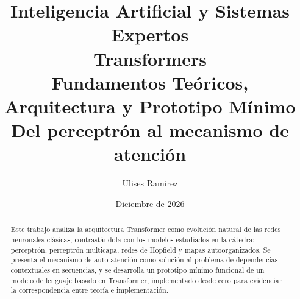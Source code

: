 \documentclass[12pt, a4paper]{article}
\title{
    \vspace{-1cm}
    {\large Inteligencia Artificial y Sistemas Expertos} \\[0.5em]
    \textbf{ Transformers } \\
    Fundamentos Teóricos, Arquitectura y Prototipo Mínimo \\[0.5em]
    {\normalsize Del perceptrón al mecanismo de atención}
}
\author{Ulises Ramirez}
\date{Diciembre de 2026}
\begin{document}
\maketitle
\thispagestyle{empty}

\begin{abstract}
Este trabajo analiza la arquitectura Transformer como evolución natural
de las redes neuronales clásicas, contrastándola con los modelos estudiados
en la cátedra: perceptrón, perceptrón multicapa, redes de Hopfield y mapas
autoorganizados. Se presenta el mecanismo de auto-atención como solución al
problema de dependencias contextuales en secuencias, y se desarrolla un
prototipo mínimo funcional de un modelo de lenguaje basado en Transformer,
implementado desde cero para evidenciar la correspondencia entre teoría e
implementación.
\end{abstract}

\tableofcontents
\newpage









\newpage
\printbibliography[heading=bibintoc, title={Referencias}]

\newpage
\appendix
%
\end{document}

